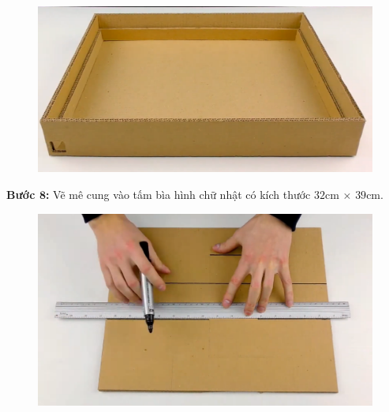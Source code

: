 \begin{multicols}{2}
	\begin{figure}[H]
		\vspace*{-5pt}
		\centering
		\captionsetup{labelformat= empty, justification=centering}
		\includegraphics[width= 0.8\linewidth]{11}
		\vspace*{-10pt}
	\end{figure}
	\textbf{\color{toancuabi}Bước $\pmb{8}$:} Vẽ mê cung vào tấm bìa hình chữ nhật có kích thước $32$cm $\times$ $39$cm.
	\begin{figure}[H]
		\vspace*{5pt}
		\centering
		\captionsetup{labelformat= empty, justification=centering}
		\includegraphics[width= 0.8\linewidth]{12}
		

\end{figure}
\end{multicols}
